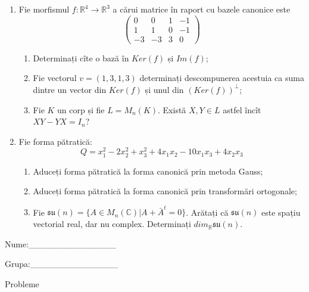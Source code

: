 \documentclass{article}
\begin{document}
\begin{enumerate}
 \item Fie morfismul $f:\mathbb{R}^4 \to \mathbb{R}^3$ a cărui matrice în raport cu bazele canonice este
$$\begin{pmatrix}
0&0&1&-1\\
1&1&0&-1\\
-3&-3&3&0
\end{pmatrix}$$

\begin{enumerate}
\item Determinați cîte o bază în $Ker(f)$ și $Im(f)$;
\item Fie vectorul $v=(1,3,1,3)$ determinați descompunerea acestuia ca suma dintre un vector din $Ker(f)$ și unul din $(Ker(f))^\perp$;
\item Fie $K$ un corp și fie $L=M_n(K)$. Există $X,Y \in L$ astfel încît $XY-YX=I_n$?  
\end{enumerate}
\item Fie forma pătratică:
$$Q= x_1^2-2x_2^2+x_3^2+4x_1x_2-10x_1x_3+4x_2x_3$$

\begin{enumerate}
\item Aduceți forma pătratică la forma canonică prin metoda Gauss;
\item Aduceți forma pătratică la forma canonică prin transformări ortogonale;
\item Fie $\mathfrak{su}(n)=\{ A \in M_n(\mathbb{C}) | A+\bar{A}^t=0\}$. Arătați că $\mathfrak{su}(n)$ este spațiu vectorial real, dar nu complex.
Determinați $dim_{\mathbb{R}}\mathfrak{su}(n)$.
\end{enumerate}
\end{enumerate}
\newpage
\begin{flushright}
Nume:\_\_\_\_\_\_\_\_\_\_\_\_\_\_
 
 
Grupa:\_\_\_\_\_\_\_\_\_\_\_\_\_\_
\end{flushright}
\begin{center}
\vspace{2cm}
{\Large Probleme}
\vspace{2cm}
\end{center}
\end{document}
